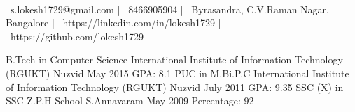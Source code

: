 \documentclass[]{awesome-cv}
\begin{document}
\begin{center}
	  \\
	\vspace{2mm}
	{\faEnvelope\ s.lokesh1729@gmail.com} | {\faMobile\ 8466905904} | {\faMapMarker\ Byrasandra, C.V.Raman Nagar, Bangalore} | {\faLink\ https://linkedin.com/in/lokesh1729} | {\faLink\ https://github.com/lokesh1729}
\end{center}
\begin{cventries}
	\cventry
	{B.Tech in Computer Science}
	{International Institute of Information Technology (RGUKT)}
	{Nuzvid}
	{May 2015}
	{GPA: 8.1}
	\cventry
	{PUC in M.Bi.P.C}
	{International Institute of Information Technology (RGUKT)}
	{Nuzvid}
	{July 2011}
	{GPA: 9.35}
	\cventry
	{SSC (X) in SSC}
	{Z.P.H School}
	{S.Annavaram}
	{May 2009}
	{Percentage: 92}
\end{cventries}
\end{document}
